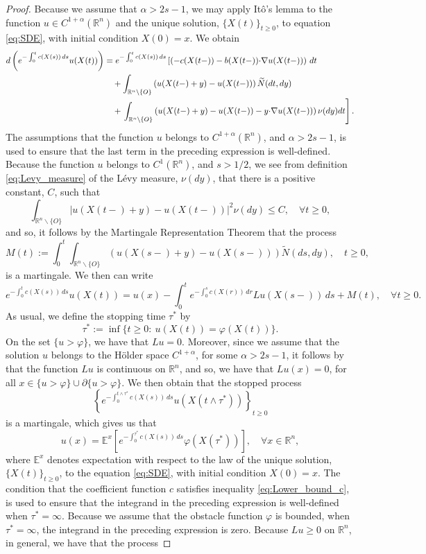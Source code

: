 \documentclass[11pt,reqno]{amsart}
\theoremstyle{definition}
\theoremstyle{remark}
\begin{document}
\begin{proof} 
Because we assume that $\alpha>2s-1$, we may apply It\^o's lemma \cite[Theorem 4.4.7]{Applebaum} to the function $u \in C^{1+\alpha}({\mathbb{R}}^n)$ and the unique solution, $\{X(t)\}_{t\geq 0}$, to equation \eqref{eq:SDE}, with initial condition $X(0)=x$. We obtain
\begin{align*}
d\left(e^{-\int_0^t c(X(s))\, ds} u(X(t))\right)
&= e^{-\int_0^t c(X(s))\, ds}\left[\left(-c(X(t-)) - b(X(t-)){\hbox{$\cdot$}}\nabla u(X(t-))\right)\, dt\right.\\
&\quad+ \int_{{\mathbb{R}}^n\backslash\{O\}}\left(u(X(t-)+y)-u(X(t-))\right)\widetilde N(dt,dy)\\
&\quad+ \left. \int_{{\mathbb{R}}^n\backslash\{O\}}\left(u(X(t-)+y)-u(X(t-))-y{\hbox{$\cdot$}}\nabla u(X(t-))\right) \nu(dy) dt\right].
\end{align*}
The assumptions that the function $u$ belongs to $C^{1+\alpha}({\mathbb{R}}^n)$, and $\alpha>2s-1$, is used to ensure that the last term in the preceding expression is well-defined. Because the function $u$ belongs to $C^1({\mathbb{R}}^n)$, and $s>1/2$, we see from definition \eqref{eq:Levy_measure} of the L\'evy measure, $\nu(dy)$, that there is a positive constant, $C$, such that
$$
\int_{{\mathbb{R}}^n\backslash\{O\}} \left|u(X(t-)+y)-u(X(t-))\right|^2 \nu(dy) \leq C,\quad\forall t \geq 0,
$$
and so, it follows by the Martingale Representation Theorem \cite[Theorem 5.3.5]{Applebaum} that the process
$$
M(t):=\int_0^t\int_{{\mathbb{R}}^n\backslash\{O\}}\left(u(X(s-)+y)-u(X(s-))\right)\widetilde N(ds,dy),\quad t\geq 0,
$$
is a martingale. We then can write
$$
e^{-\int_0^t c(X(s))\, ds} u(X(t))= u(x)- \int_0^t e^{-\int_0^s c(X(r))\, dr} Lu(X(s-))\, ds +M(t),\quad\forall t \geq 0.
$$
As usual, we define the stopping time $\tau^*$ by
$$
\tau^*:=\inf\{t \geq 0:\ u(X(t))=\varphi(X(t))\}.
$$
On the set $\{u>\varphi\}$, we have that $Lu=0$. Moreover, since we assume that the solution $u$ belongs to the H\"older space $C^{1+\alpha}$, for some $\alpha>2s-1$, it follows by \cite[Proposition 2.6]{Silvestre_2007} that the function $Lu$ is continuous on ${\mathbb{R}}^n$, and so, we have that $Lu(x)=0$, for all $x\in\{u>\varphi\}\cup\partial\{u>\varphi\}$. We then obtain that the stopped process
$$
\left\{e^{-\int_0^{t\wedge\tau^*} c(X(s))\, ds} u(X(t\wedge\tau^*))\right\}_{t\geq 0}
$$
is a martingale, which gives us that
$$
u(x)={\mathbb{E}}^x\left[e^{-\int_0^{\tau^*} c(X(s))\, ds} \varphi(X(\tau^*))\right],\quad\forall x\in{\mathbb{R}}^n,
$$
where ${\mathbb{E}}^x$ denotes expectation with respect to the law of the unique solution, $\{X(t)\}_{t\geq 0}$, to the equation \eqref{eq:SDE}, with initial condition $X(0)=x$. The condition that the coefficient function $c$ satisfies inequality \eqref{eq:Lower_bound_c}, is used to ensure that the integrand in the preceding expression is well-defined when $\tau^*=\infty$. Because we assume that the obstacle function $\varphi$ is bounded, when $\tau^*=\infty$, the integrand in the preceding expression is zero. Because $Lu \geq 0$ on ${\mathbb{R}}^n$, in general, we have that the process

\end{proof}
\end{document}
